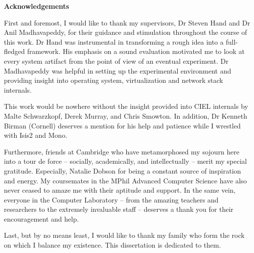 \newpage
{\Huge \bf Acknowledgements}

\vspace{24pt} 
First and foremost, I would like to thank my supervisors, Dr Steven Hand and Dr
Anil Madhavapeddy, for their guidance and stimulation throughout the course of
this work. Dr Hand was instrumental in transforming a rough idea into a
full-fledged framework. His emphasis on a sound evaluation motivated me to look
at every system artifact from the point of view of an eventual experiment. Dr
Madhavapeddy was helpful in setting up the experimental environment and
providing insight into operating system, virtualization and network stack
internals.

This work would be nowhere without the insight provided into CIEL internals by
Malte Schwarzkopf, Derek Murray, and Chris Smowton. In addition, Dr Kenneth
Birman (Cornell) deserves a mention for his help and patience while I wrestled
with Isis2 and Mono.

Furthermore, friends at Cambridge who have metamorphosed my sojourn here into a
tour de force  -- socially, academically, and intellectually -- merit my special
gratitude. Especially, Natalie Dobson for being a constant source of inspiration
and energy. My coursemates in the MPhil Advanced Computer Science have also
never ceased to amaze me with their aptitude and support. In the same vein,
everyone in the Computer Laboratory -- from the amazing teachers and researchers
to the extremely invaluable staff -- deserves a thank you for their
encouragement and help.

Last, but by no means least, I would like to thank my family who form the rock
on which I balance my existence. This dissertation is dedicated to them.

\vfill

\newpage
\vspace*{\fill}
